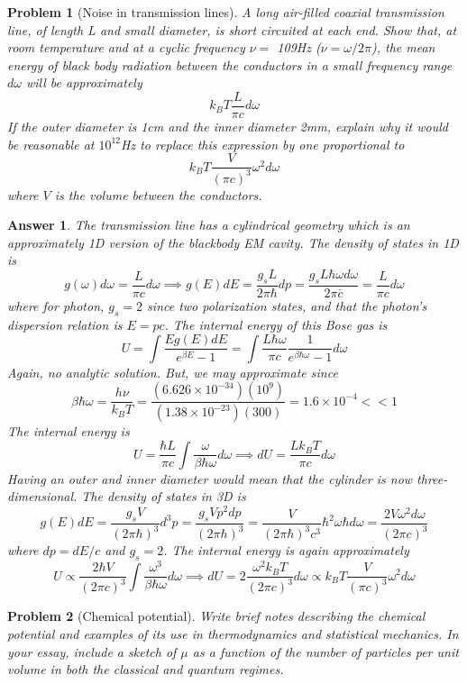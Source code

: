 \documentclass[a4paper]{article}
\newtheorem{ans}{Answer}[section]
\theoremstyle{new}
\newtheorem{qns}{Problem}[section]
\begin{document}
\begin{qns}[Noise in transmission lines]
A long air-filled coaxial transmission line, of length L and small diameter, is short circuited at each end. Show that, at room temperature and at a cyclic frequency $\nu =$ 109Hz ($\nu = \omega/2\pi$), the mean energy of black body radiation between the conductors in a small frequency range $d\omega$ will be approximately
$$k_BT\frac{L}{\pi c}d\omega$$
If the outer diameter is 1cm and the inner diameter 2mm, explain why it would be reasonable at $10^{12}$Hz to replace this expression by one proportional to
$$k_BT\frac{V}{(\pi c)^3}\omega^2d\omega$$
where $V$ is the volume between the conductors.
\end{qns}
\begin{ans}
The transmission line has a cylindrical geometry which is an approximately 1D version of the blackbody EM cavity. The density of states in 1D is
$$g(\omega)d\omega=\frac{L}{\pi c}d\omega\implies g(E)dE=\frac{g_sL}{2\pi\hbar}dp=\frac{g_sL\hbar\omega d\omega}{2\pi\bar c}=\frac{L}{\pi c}d\omega$$
where for photon, $g_s=2$ since two polarization states, and that the photon's dispersion relation is $E=pc$. The internal energy of this Bose gas is
$$U=\int\frac{Eg(E)dE}{e^{\beta E}-1}=\int\frac{L\hbar\omega}{\pi c}\frac{1}{e^{\beta\hbar\omega}-1}d\omega$$
Again, no analytic solution. But, we may approximate since
$$\beta\hbar\omega=\frac{h\nu}{k_BT}=\frac{(6.626\times10^{-34})(10^9)}{(1.38\times10^{-23})(300)}=1.6\times10^{-4}<<1$$
The internal energy is
$$U=\frac{\hbar L}{\pi c}\int\frac{\omega}{\beta\hbar\omega}d\omega\implies dU=\frac{Lk_BT}{\pi c}d\omega$$
Having an outer and inner diameter would mean that the cylinder is now three-dimensional. The density of states in 3D is
$$g(E)dE=\frac{g_sV}{(2\pi\hbar)^3}d^3p=\frac{g_sVp^2dp}{(2\pi\hbar)^3}=\frac{V}{(2\pi\hbar)^3c^3}\hbar^2\omega\hbar d\omega=\frac{2V\omega^2d\omega}{(2\pi c)^3}$$
where $dp=dE/c$ and $g_s=2$. The internal energy is again approximately
$$U\propto\frac{2\hbar V}{(2\pi c)^3}\int\frac{\omega^3}{\beta\hbar\omega}d\omega\implies dU=2\frac{\omega^2k_BT}{(2\pi c)^3}d\omega\propto k_BT\frac{V}{(\pi c)^3}\omega^2d\omega$$
\end{ans}
\newpage
\begin{qns}[Chemical potential]
Write brief notes describing the chemical potential and examples of its use in thermodynamics and statistical mechanics. In your essay, include a sketch of $\mu$ as a function of the number of particles per unit volume in both the classical and quantum regimes.
\end{qns}
\end{document}
